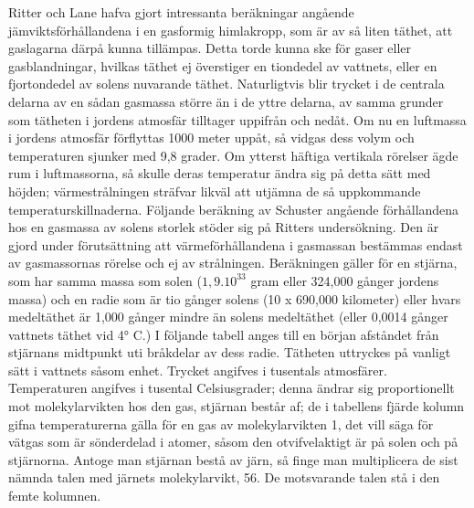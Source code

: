 \documentclass[a4paper, 12pt, oneside, swedish]{article}
\begin{document}
Ritter och Lane hafva gjort intressanta beräkningar angående jämviktsförhållandena i en gasformig himlakropp, som är av så liten täthet, att gaslagarna därpå kunna tillämpas. Detta torde kunna ske för gaser eller gasblandningar, hvilkas täthet ej överstiger en tiondedel av vattnets, eller en fjortondedel av solens nuvarande täthet. Naturligtvis blir trycket i de centrala delarna av en sådan gasmassa större än i de yttre delarna, av samma grunder som tätheten i jordens atmosfär tilltager uppifrån och nedåt. Om nu en luftmassa i jordens atmosfär förflyttas 1000 meter uppåt, så vidgas dess volym och temperaturen sjunker med 9,8 grader. Om ytterst häftiga vertikala rörelser ägde rum i luftmassorna, så skulle deras temperatur ändra sig på detta sätt med höjden; värmestrålningen sträfvar likväl att utjämna de så uppkommande temperaturskillnaderna. Följande beräkning av Schuster angående förhållandena hos en gasmassa av solens storlek stöder sig på Ritters undersökning. Den är gjord under förutsättning att värmeförhållandena i gasmassan bestämmas endast av gasmassornas rörelse och ej av strålningen. Beräkningen gäller för en stjärna, som har samma massa som solen ($1,9.10^{33}$ gram eller 324,000 gånger jordens massa) och en radie som är tio gånger solens (10 x 690,000 kilometer) eller hvars medeltäthet är 1,000 gånger mindre än solens medeltäthet (eller 0,0014 gånger vattnets täthet vid 4° C.) I följande tabell anges till en början afståndet från stjärnans midtpunkt uti bråkdelar av dess radie. Tätheten uttryckes på vanligt sätt i vattnets såsom enhet. Trycket angifves i tusentals atmosfärer. Temperaturen angifves i tusental Celsiusgrader; denna ändrar sig proportionellt mot molekylarvikten hos den gas, stjärnan består af; de i tabellens fjärde kolumn gifna temperaturerna gälla för en gas av molekylarvikten 1, det vill säga för vätgas som är sönderdelad i atomer, såsom den otvifvelaktigt är på solen och på stjärnorna. Antoge man stjärnan bestå av järn, så finge man multiplicera de sist nämnda talen med järnets molekylarvikt, 56. De motsvarande talen stå i den femte kolumnen.
\end{document}
